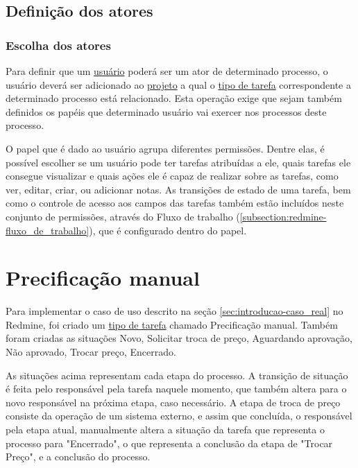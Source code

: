 \subsection{Definição dos atores}\label{subsection:redmine-automatizar_processo-atores}

\subsubsection{Escolha dos atores}

Para definir que um \underline{usuário} poderá ser um ator de determinado processo, o usuário deverá ser adicionado ao \underline{projeto} a qual o \underline{tipo de tarefa} correspondente a determinado processo está relacionado. Esta operação exige que sejam também definidos os papéis que determinado usuário vai exercer nos processos deste processo.

O papel que é dado ao usuário agrupa diferentes permissões. Dentre elas, é possível escolher se um usuário pode ter tarefas atribuídas a ele, quais tarefas ele consegue visualizar e quais ações ele é capaz de realizar sobre as tarefas, como ver, editar, criar, ou adicionar notas. As transições de estado de uma tarefa, bem como o controle de acesso aos campos das tarefas também estão incluídos neste conjunto de permissões, através do Fluxo de trabalho (\ref{subsection:redmine-fluxo_de_trabalho}), que é configurado dentro do papel.

\section{Precificação manual}\label{sec:redmine-impl-caso-uso}

Para implementar o caso de uso descrito na seção \ref{sec:introducao-caso_real} no Redmine, foi criado um \underline{tipo de tarefa} chamado Precificação manual. Também foram criadas as situações Novo, Solicitar troca de preço, Aguardando aprovação, Não aprovado, Trocar preço, Encerrado.

As situações acima representam cada etapa do processo. A transição de situação é feita pelo responsável pela tarefa naquele momento, que também altera para o novo responsável na próxima etapa, caso necessário. A etapa de troca de preço consiste da operação de um sistema externo, e assim que concluída, o responsável pela etapa atual, manualmente altera a situação da tarefa que representa o processo para "Encerrado", o que representa a conclusão da etapa de "Trocar Preço", e a conclusão do processo.

